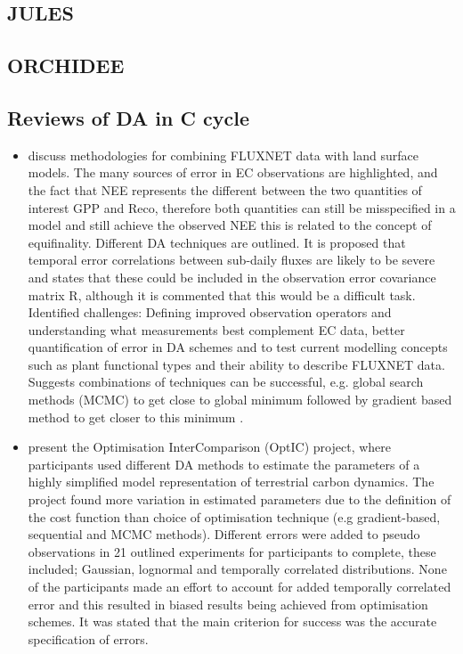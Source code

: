 \documentclass[12pt, a4paper]{article}
\begin{document}
\subsection{JULES}

\subsection{ORCHIDEE}

\subsection{Reviews of DA in C cycle}

\begin{itemize}

\item \citet{williams2009improving} discuss methodologies for combining FLUXNET data with land surface models. The many sources of error in EC observations are highlighted, and the fact that NEE represents the different between the two quantities of interest GPP and Reco, therefore both quantities can still be misspecified in a model and still achieve the observed NEE this is related to the concept of equifinality.  Different DA techniques are outlined. It is proposed that temporal error correlations between sub-daily fluxes are likely to be severe and states that these could be included in the observation error covariance matrix R, although it is commented that this would be a difficult task. Identified challenges: Defining improved observation operators and understanding what measurements best complement EC data, better quantification of error in DA schemes and to test current modelling concepts such as plant functional types and their ability to describe FLUXNET data. Suggests combinations of techniques can be successful, e.g. global search methods (MCMC) to get close to global minimum followed by gradient based method to get closer to this minimum \citep{vrugt2005improved}.  

\item \citet{trudinger2007optic} present the Optimisation InterComparison (OptIC) project, where participants used different DA methods to estimate the parameters of a highly simplified model representation of terrestrial carbon dynamics. The project found more variation in estimated parameters due to the definition of the cost function than choice of optimisation technique (e.g gradient-based, sequential and MCMC methods). Different errors were added to pseudo observations in 21 outlined experiments for participants to complete, these included; Gaussian, lognormal and temporally correlated distributions. None of the participants made an effort to account for added temporally correlated error and this resulted in biased results being achieved from optimisation schemes. It was stated that the main criterion for success was the accurate specification of errors. 


\end{itemize}
\end{document}
